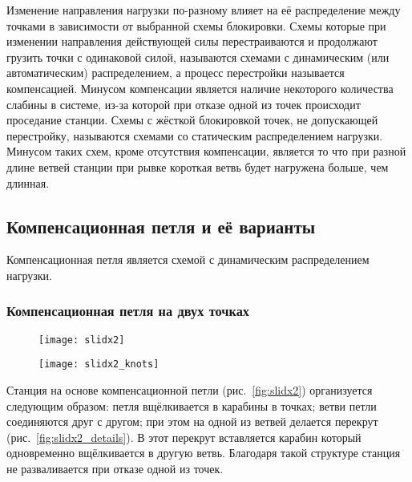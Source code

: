 \documentclass[fleqn, 12pt]{extarticle}
\begin{document}
    Изменение направления нагрузки по-разному влияет на её распределение между точками в зависимости от выбранной схемы блокировки. Схемы которые при изменении направления
    действующей силы перестраиваются и продолжают грузить точки с одинаковой силой, называются схемами с динамическим (или автоматическим) распределением, а процесс перестройки 
    называется компенсацией. Минусом компенсации является наличие некоторого количества слабины в системе, из-за которой при отказе одной из точек происходит проседание станции. 
    Схемы с жёсткой блокировкой точек, не допускающей перестройку, называются схемами со статическим распределением нагрузки. Минусом таких схем, кроме отсутствия компенсации,
    является то что при разной длине ветвей станции при рывке короткая ветвь будет нагружена больше, чем длинная.

\subsection{Компенсационная петля и её варианты}
    Компенсационная петля является схемой с динамическим распределением нагрузки.
    
    \subsubsection{Компенсационная петля на двух точках}
    \begin{figure}[h]
        \centering
        \begin{minipage}[t]{0.45\textwidth}
            \texttt{[image: slidx2]}
            \label{fig:slidx2}
        \end{minipage}\hspace{0.05\textwidth}
        \begin{minipage}[t]{0.45\textwidth}
            \texttt{[image: slidx2\_knots]}
            \label{fig:slidx2_knots}
        \end{minipage}
    \end{figure}
    
    Станция на основе компенсационной петли (рис.~\ref{fig:slidx2}) организуется следующим образом: петля вщёлкивается в карабины в точках; ветви петли соединяются друг с другом;
    при этом на одной из ветвей делается перекрут (рис.~\ref{fig:slidx2_details}). В этот перекрут вставляется карабин который одновременно вщёлкивается в другую ветвь.
    Благодаря такой структуре станция не разваливается при отказе одной из точек. 
    
\end{document}
